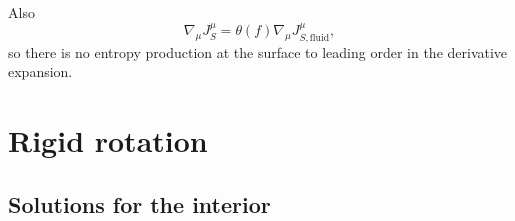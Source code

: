 \documentclass[12pt]{article}
\newcommand{\surf}{_\text{surface}}
\begin{document}
Also
%
\begin{equation*}
  \nabla_\mu J^\mu_S= \theta(f)\nabla_\mu J^\mu_{S,\text{fluid}},
\end{equation*}
%
so there is no entropy production at the surface to leading order in the derivative expansion.





\section{Rigid rotation}\label{sec:rigidrot}

\subsection{Solutions for the interior}\label{sec:rotint}
\end{document}
